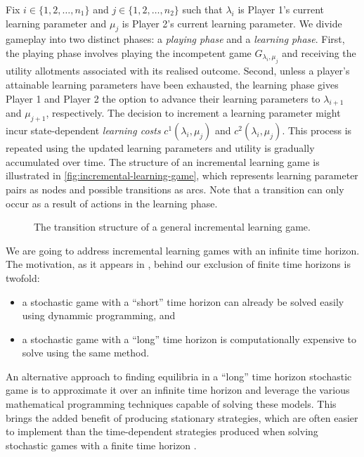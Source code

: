     Fix $i \in \{1, 2, \ldots, n_1\}$ and $j \in \{1, 2, \ldots, n_2\}$ such that $\lambda_i$ is Player 1's current learning parameter and $\mu_j$ is Player 2's current learning parameter.
    We divide gameplay into two distinct phases: a \emph{playing phase} and a \emph{learning phase}.
    First, the playing phase involves playing the incompetent game $G_{\lambda_i, \mu_j}$ and receiving the utility allotments associated with its realised outcome.
    Second, unless a player's attainable learning parameters have been exhausted, the learning phase gives Player 1 and Player 2 the option to advance their learning parameters to $\lambda_{i + 1}$ and $\mu_{j + 1}$, respectively.
    The decision to increment a learning parameter might incur state-dependent \emph{learning costs} $c^1(\lambda_i, \mu_j)$ and $c^2(\lambda_i, \mu_j)$.
    This process is repeated using the updated learning parameters and utility is gradually accumulated over time.
    The structure of an incremental learning game is illustrated in \autoref{fig:incremental-learning-game}, which represents learning parameter pairs as nodes and possible transitions as arcs.
    Note that a transition can only occur as a result of actions in the learning phase.

    \begin{figure}[t]
        \centering
        
        \caption[Structure of an Incremental Learning Game]{The transition structure of a general incremental learning game.}
        \label{fig:incremental-learning-game}
    \end{figure}

    We are going to address incremental learning games with an infinite time horizon.
    The motivation, as it appears in \parencite[Section 2.2]{Filar1997}, behind our exclusion of finite time horizons is twofold:
    \begin{itemize}
        \item a stochastic game with a ``short'' time horizon can already be solved easily using dynammic programming, and
        \item a stochastic game with a ``long'' time horizon is computationally expensive to solve using the same method.
    \end{itemize}
    An alternative approach to finding equilibria in a ``long'' time horizon stochastic game is to approximate it over an infinite time horizon and leverage the various mathematical programming techniques capable of solving these models.
    This brings the added benefit of producing stationary strategies, which are often easier to implement than the time-dependent strategies produced when solving stochastic games with a finite time horizon \parencite{Filar1997}.

